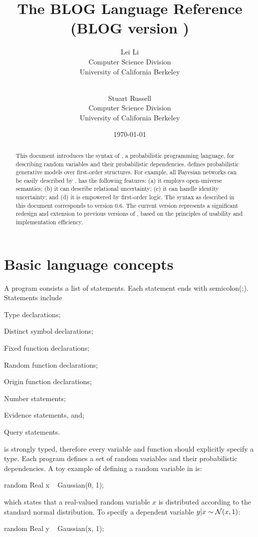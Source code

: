 \documentclass[12pt]{article}
\title{The BLOG Language Reference  \\
{\large (BLOG version \blogversion)}
}
\author{Lei Li\\
              Computer Science Division\\
              University of California Berkeley\\
               \email{leili@cs.berkeley.edu}\\
\and
               Stuart Russell\\
              Computer Science Division\\
              University of California Berkeley\\
               \email{russell@cs.berkeley.edu}
               }
\date{\today}
\newcommand{\blogversion}{0.6\xspace}
\begin{document}
\maketitle


\begin{abstract}
This document introduces the syntax of \bl, a probabilistic programming language, for describing random variables and their probabilistic dependencies.  
\bl defines probabilistic generative models over first-order structures. For example, all Bayesian networks can be easily described by \bl.  
\bl has the following features: 
(a) it employs open-universe semantics;
(b) it can describe relational uncertainty;
(c) it can handle identity uncertainty; and
(d) it is empowered by first-order logic.
The syntax as described in this document corresponds to \bl version \blogversion. The current version represents a significant redesign and extension to previous versions of \bl, based on the principles of usability and implementation efficiency.
\end{abstract}

\clearpage

\tableofcontents

\clearpage

\section{Basic language concepts}
A \bl program consists a list of statements.
Each statement ends with semicolon(;). 
Statements include 
\begin{enumerate*}
\item Type declarations; 
\item Distinct symbol declarations;
\item Fixed function declarations;
\item Random function declarations;
\item Origin function declarations;
\item Number statements;
\item Evidence statements, and;
\item Query statements.
\end{enumerate*}

\bl is strongly typed, therefore every variable and function should explicitly specify a type.
Each \bl program defines a set of random variables and their probabilistic dependencies. 
A toy example of defining a random variable in \bl is:

\begin{blogcode}
random Real x ~ Gaussian(0, 1);
\end{blogcode}
which states that a real-valued random variable $x$ is distributed according to the standard normal distribution. 
To specify a dependent variable $y | x \sim \mathcal{N}(x, 1)$:
\begin{blogcode}
random Real y ~ Gaussian(x, 1);
\end{blogcode}
\end{document}
